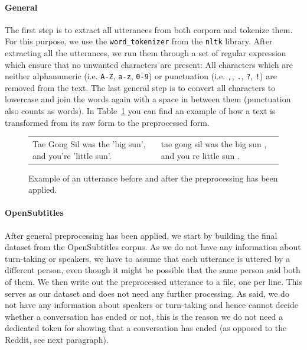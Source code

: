\paragraph{General} The first step is to extract all utterances from both corpora and tokenize them. For this purpose, we use the \texttt{word\_tokenizer} from the \texttt{nltk} library. After extracting all the utterances, we run them through a set of regular expression which ensure that no unwanted characters are present: All characters which are neither alphanumeric (i.e. \texttt{A-Z}, \texttt{a-z}, \texttt{0-9}) or punctuation (i.e. \texttt{,}, \texttt{.}, \texttt{?}, \texttt{!}) are removed from the text. The last general step is to convert all characters to lowercase and join the words again with a space in between them (punctuation also counts as words). In Table~\ref{data:preprocessing:table_after_preprocessing} you can find an example of how a text is transformed from its raw form to the preprocessed form.
\\
\begin{figure}[h]
	\centering
	\begin{adjustbox}{max width=\textwidth}
		\begin{tabular}{ll}
			\toprule
			\specialcell{Raw Utterance} & \specialcell{Preprocessed Utterance}\\
			\midrule
			Tae Gong Sil was the 'big sun', and you're 'little sun'. & tae gong sil was the big sun , and you re little sun . \\
			\bottomrule
		\end{tabular}
	\end{adjustbox}
	\caption{Example of an utterance before and after the preprocessing has been applied.}
	\label{data:preprocessing:table_after_preprocessing}
\end{figure}

\paragraph{OpenSubtitles} After general preprocessing has been applied, we start by building the final dataset from the OpenSubtitles corpus. As we do not have any information about turn-taking or speakers, we have to assume that each utterance is uttered by a different person, even though it might be possible that the same person said both of them. We then write out the preprocessed utterance to a file, one per line. This serves as our dataset and does not need any further processing. As said, we do not have any information about speakers or turn-taking and hence cannot decide whether a conversation has ended or not, this is the reason we do not need a dedicated token for showing that a conversation has ended (as opposed to the Reddit, see next paragraph).

